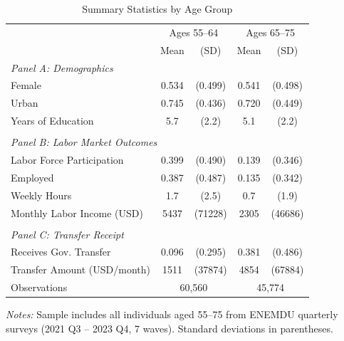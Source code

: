 \begin{table}[t]
\centering
\begin{threeparttable}
\caption{Summary Statistics by Age Group}
\label{tab:summary}
\begin{tabular}{lcccc}
\hline\hline
  & \multicolumn{2}{c}{Ages 55--64} & \multicolumn{2}{c}{Ages 65--75} \\
  & Mean & (SD) & Mean & (SD) \\
\hline
  \multicolumn{5}{l}{\textit{Panel A: Demographics}} \\
  Female & 0.534 & (0.499) & 0.541 & (0.498) \\
  Urban & 0.745 & (0.436) & 0.720 & (0.449) \\
  Years of Education & 5.7 & (2.2) & 5.1 & (2.2) \\
  \\
  \multicolumn{5}{l}{\textit{Panel B: Labor Market Outcomes}} \\
  Labor Force Participation & 0.399 & (0.490) & 0.139 & (0.346) \\
  Employed & 0.387 & (0.487) & 0.135 & (0.342) \\
  Weekly Hours & 1.7 & (2.5) & 0.7 & (1.9) \\
  Monthly Labor Income (USD) & 5437 & (71228) & 2305 & (46686) \\
  \\
  \multicolumn{5}{l}{\textit{Panel C: Transfer Receipt}} \\
  Receives Gov. Transfer & 0.096 & (0.295) & 0.381 & (0.486) \\
  Transfer Amount (USD/month) & 1511 & (37874) & 4854 & (67884) \\
\hline
  Observations & \multicolumn{2}{c}{60,560} & \multicolumn{2}{c}{45,774} \\
\hline\hline
\end{tabular}
\begin{tablenotes}
\item \textit{Notes:} Sample includes all individuals aged 55--75 from ENEMDU quarterly surveys (2021 Q3 -- 2023 Q4, 7 waves). Standard deviations in parentheses.
\end{tablenotes}
\end{threeparttable}
\end{table}
